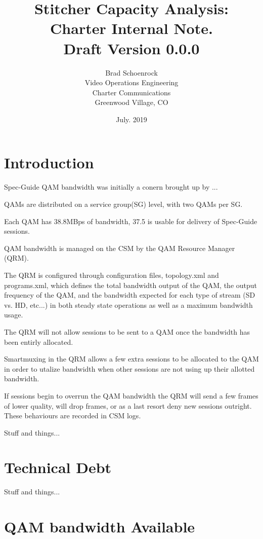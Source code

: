 \documentclass{article}
\author{Brad Schoenrock\\Video Operations Engineering\\Charter Communications\\Greenwood Village, CO}
\title{Stitcher Capacity Analysis:\\Charter Internal Note.\\Draft Version 0.0.0}
\date{July. 2019}
\begin{document}
\maketitle
\newpage

\tableofcontents
\newpage

\section{Introduction}
\label{SECTION-Introduction}

Spec-Guide QAM bandwidth was initially a conern brought up by ...

QAMs are distributed on a service group(SG) level, with two QAMs per SG.

Each QAM has 38.8MBps of bandwidth, 37.5 is usable for delivery of Spec-Guide sessions. 

QAM bandwidth is managed on the CSM by the QAM Resource Manager (QRM). 

The QRM is configured through configuration files, topology.xml and programs.xml, which defines the total bandwidth output of the QAM, the output frequency of the QAM, and the bandwidth expected for each type of stream (SD vs. HD, etc...) in both steady state operations as well as a maximum bandwidth usage.  

The QRM will not allow sessions to be sent to a QAM once the bandwidth has been entirly allocated. 

Smartmuxing in the QRM allows a few extra sessions to be allocated to the QAM in order to utalize bandwidth when other sessions are not using up their allotted bandwidth. 

If sessions begin to overrun the QAM bandwidth the QRM will send a few frames of lower quality, will drop frames, or as a last resort deny new sessions outright. These behaviours are recorded in CSM logs. 

Stuff and things... 

\section{Technical Debt}
\label{SECTION-TechDebt}

Stuff and things... 

\section{QAM bandwidth Available}
\label{SECTION-QAMBandwidthAvailable}
\end{document}
